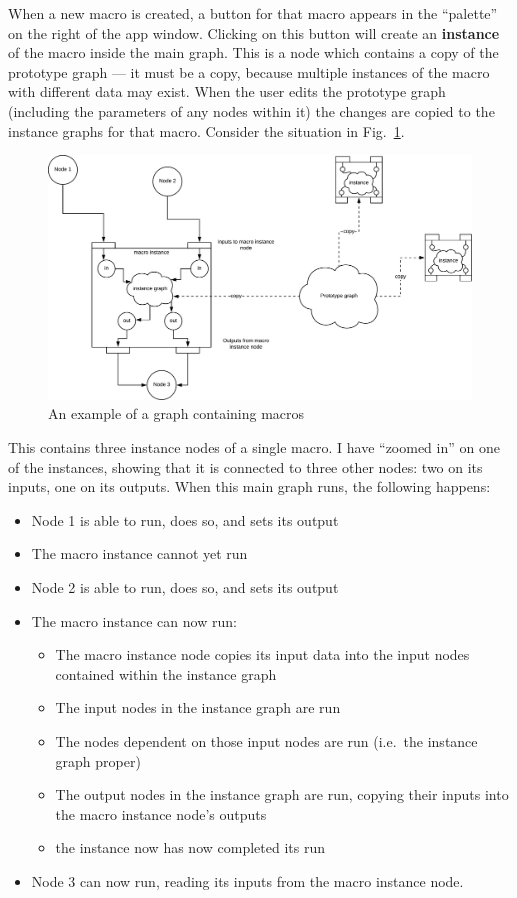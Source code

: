 When a new macro is created, a button for that macro appears in the ``palette''
on the right of the app window. Clicking on this button will create
an \textbf{instance} of the macro inside the main graph. This is a
node which contains a copy of the prototype graph --- it must be a copy,
because multiple instances of the macro with different data may exist.
When the user edits the prototype graph (including the parameters of 
any nodes within it) the changes are copied to the instance graphs for
that macro. Consider the situation in Fig.~\ref{macroobjs.pdf}.
\begin{figure}[ht]
\center
\includegraphics[width=5in]{macroobjs.pdf}
\caption{An example of a graph containing macros}
\label{macroobjs.pdf}
\end{figure}
This contains three instance nodes of a single macro. 
I have ``zoomed in'' on one of the instances, showing that it is connected
to three other nodes: two on its inputs, one on its outputs.
When this main graph runs, the following happens:
\begin{itemize}
\item Node 1 is able to run, does so, and sets its output
\item The macro instance cannot yet run
\item Node 2 is able to run, does so, and sets its output
\item The macro instance can now run:
\begin{itemize}
\item The macro instance node copies its input data
into the input nodes contained within the instance graph
\item The input nodes in the instance graph are run
\item The nodes dependent on those input nodes are run (i.e.\ the
instance graph proper)
\item The output nodes in the instance graph are run, copying their
inputs into the macro instance node's outputs
\item the instance now has now completed its run
\end{itemize}
\item Node 3 can now run, reading its inputs from the macro instance node.
\end{itemize}

